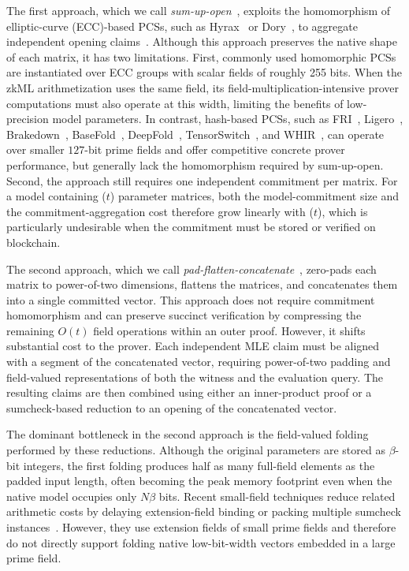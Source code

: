The first approach, which we call \emph{sum-up-open}~\cite{uss/0001SLLGCZ25,sp/QuGYZ26,ccs/SunLZ24}, exploits the homomorphism of elliptic-curve (ECC)-based PCSs, such as Hyrax~\cite{sp/WahbyTSTW18} or Dory~\cite{tcc/Lee21}, to aggregate independent opening claims~\cite{ccs/LiuXZ21,asiacrypt/BootleCGGHJ17}.
Although this approach preserves the native shape of each matrix, it has two limitations. First, commonly used homomorphic PCSs are instantiated over ECC groups with scalar fields of roughly 255 bits.
When the zkML arithmetization uses the same field, its field-multiplication-intensive prover computations must also operate at this width, limiting the benefits of low-precision model parameters. In contrast, hash-based PCSs, such as FRI~\cite{icalp/Ben-SassonBHR18}, Ligero~\cite{ccs/AmesHIYM17}, Brakedown~\cite{crypto/GolovnevLSTW21}, BaseFold~\cite{crypto/ZeilbergerCF24}, DeepFold~\cite{usenix/GuoLHQTZ25}, TensorSwitch~\cite{iacr/BunzFRW25}, and WHIR~\cite{eurocrypt/ArnonCFY25}, can operate over smaller $127$-bit prime fields and offer competitive concrete prover performance, but generally lack the homomorphism required by sum-up-open.
Second, the approach still requires one independent commitment per matrix. For a model containing ($t$) parameter matrices, both the model-commitment size and the commitment-aggregation cost therefore grow linearly with ($t$), which is particularly undesirable when the commitment must be stored or verified on blockchain.

The second approach, which we call
\emph{pad-flatten-concatenate}~\cite{ccs/LiuXZ21,asiacrypt/CongCYY25},
zero-pads each matrix to power-of-two dimensions, flattens the matrices, and
concatenates them into a single committed vector.
This approach does not require commitment homomorphism and can preserve succinct verification by compressing the remaining $O(t)$ field operations within an outer proof.
However, it shifts substantial cost to the prover.
Each independent MLE claim must be aligned with a segment of the concatenated vector, requiring
power-of-two padding and field-valued representations of both the witness and
the evaluation query.
The resulting claims are then combined using either an inner-product proof or a sumcheck-based reduction to an opening of the concatenated vector.

The dominant bottleneck in the second approach is the field-valued folding performed by these
reductions.
Although the original parameters are stored as $\beta$-bit integers, the first folding produces half as many full-field elements as the padded input length,
often becoming the peak memory footprint even when the native model occupies only $N\beta$ bits.
Recent small-field techniques reduce related arithmetic costs by delaying extension-field binding or packing multiple sumcheck instances~\cite{iacr/BagadDT24,iacr/PackedSumcheck25}. However, they use extension fields of small prime fields and therefore do not directly support folding native low-bit-width vectors embedded in a large prime field.

